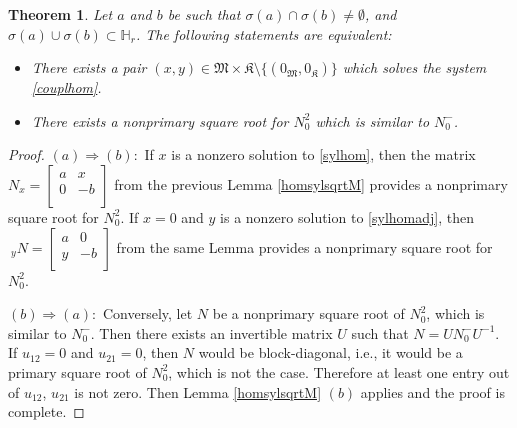 \documentclass{article}
\newtheorem{theorem}{Theorem}[section]
\theoremstyle{definition}
\def\M{\mathfrak{M}}
\def\K{\mathfrak{K}}
\def\HR{\mathbb{H}_r}
\newcommand{\mat}[4]{\left[\begin{array}{cc}#1 & #2 \\ #3 & #4 \\
	\end{array}\right]}
\begin{document}
\begin{theorem} \label{0,0} Let $a$ and $b$ be such that $\sigma(a)\cap\sigma(b)\neq\emptyset$, and $\sigma(a)\cup\sigma(b)\subset\HR$. The following statements are equivalent:
\begin{itemize}
\item[(a)] There exists a pair $(x,y)\in \M\times\K\setminus\{(0_\M,0_\K)\}$ which solves the system \eqref{couplhom}.
\item[(b)] There exists a nonprimary square root for $N_0^2$ which is similar to $N_0^-$.
\end{itemize}
\end{theorem}
\begin{proof} $(a)\Rightarrow(b):$ If $x$ is a nonzero solution to \eqref{sylhom}, then the matrix $N_x=\mat{a}{x}{0}{-b}$ from the previous Lemma \ref{homsylsqrtM} provides a nonprimary square root for $N_0^2$. If $x=0$ and $y$ is a nonzero solution to \eqref{sylhomadj}, then $\ _yN=\mat{a}{0}{y}{-b}$ from the same Lemma provides a nonprimary square root for $N_0^2$. 

$(b)\Rightarrow(a):$ Conversely, let $N$ be a nonprimary square root of $N_0^2$, which is similar to $N_0^-$. Then there exists an invertible matrix $U$ such that $N=UN_0^{-}U^{-1}$. If $u_{12}=0$ and $u_{21}=0$, then $N$ would be block-diagonal, i.e., it would be a primary square root of $N_0^2$, which is not the case. Therefore at least one entry out of $u_{12}$, $u_{21}$ is not zero. Then Lemma \ref{homsylsqrtM} $(b)$ applies and the proof is complete. 
\end{proof}
\end{document}
